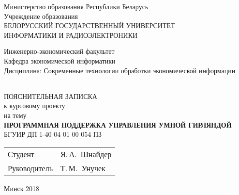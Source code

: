 \begin{titlepage}
  \begin{center}
    Министерство образования Республики Беларусь\\[1em]
    Учреждение образования\\
    БЕЛОРУССКИЙ ГОСУДАРСТВЕННЫЙ УНИВЕРСИТЕТ \\
    ИНФОРМАТИКИ И РАДИОЭЛЕКТРОНИКИ\\[1em]

    \begin{minipage}{\textwidth}
      \begin{flushleft}
          Инженерно-экономический факультет\\
          Кафедра экономической информатики\\
          Дисциплина: Современные технологии обработки экономической информации
      \end{flushleft}
    \end{minipage}\\[3em]

    {ПОЯСНИТЕЛЬНАЯ ЗАПИСКА}\\
    {к курсовому проекту}\\
    {на тему}\\[3em]
    \textbf{\large\MakeUppercase{Программная поддержка управления \newline умной гирляндой}}\\[1em]


    {БГУИР ДП  1-40 04 01 00 054 ПЗ}\\[2em]
    
    \begin{tabular}{ p{}p{} }
      Студент & Я.\,А.~Шнайдер \\
      Руководитель & Т.\,М.~Унучек
    \end{tabular}
    
    \vfill
    {\normalsize Минск 2018}
  \end{center}
\end{titlepage}
